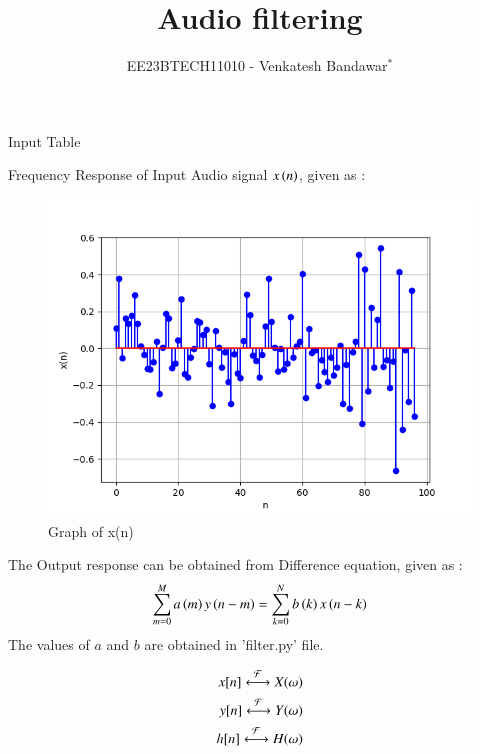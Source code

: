 \documentclass[journal,12pt,twocolumn]{IEEEtran}
\theoremstyle{remark}
\begin{document}

\vspace{3cm}

\title{Audio filtering}
\author{EE23BTECH11010 - Venkatesh Bandawar$^{*}$%
}
\maketitle
\newpage
\bigskip

\renewcommand{\thefigure}{\arabic{figure}}
\renewcommand{\thetable}{\arabic{table}}



\begin{table}[htbp] 
\centering

\caption{Input Table}
\end{table}

Frequency Response of Input Audio signal $x\left(n\right)$, given as :
\begin{figure}[!h] 
\centering
\includegraphics[width=\columnwidth]{figs/x(n).png}
\caption{Graph of x(n)}
\end{figure}

The Output response can be obtained from Difference equation, given as :\\
\begin{align}
    \sum _{m=0}^{M}a\left(m\right)y\left(n-m\right)=\sum _{k=0}^{N}b\left(k\right)x\left(n-k\right)
\end{align}
The values of $a$ and $b$ are obtained in 'filter.py'  file.

\begin{align}
    x[n] \system{\mathcal{F}} X(\omega)\\
    y[n] \system{\mathcal{F}} Y(\omega)\\
    h[n] \system{\mathcal{F}} H(\omega)
\end{align}
\end{document}
